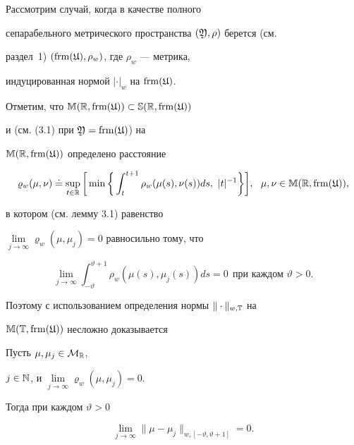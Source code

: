\begin{exams}


Рассмотрим случай, когда в качестве полного


сепарабельного метрического пространства $(\frak Y,\rho)$ берется (см.


раздел~1) $(\operatorname{frm}(\frak U),\rho_w)$, где $\rho_w$ --- метрика,


индуцированная нормой $|\cdot|_w$ на $\operatorname{frm}(\frak U)$.


Отметим, что $\Bbb M(\Bbb R,\operatorname{frm}(\frak U))\subset\Bbb S(\Bbb R,\operatorname{frm}(\frak U))$


и (см. (3.1) при $\frak Y=\operatorname{frm}(\frak U)$) на


$\Bbb M(\Bbb R,\operatorname{frm}(\frak U))$ определено расстояние


$$


\varrho_w(\mu,\nu)\doteq\sup_{t\in\Bbb R}


\bigg[\min\bigg\{\int_t^{t+1}


\rho_w(\mu(s),\nu(s))ds,\ |t|^{-1}\bigg\}\bigg],


\ \ \mu, \nu\in\Bbb M(\Bbb R,\frm(\frak U)),


$$


в котором (см. лемму 3.1) равенство


$\lim\limits_{j\to\infty}\varrho_w(\mu,\mu_j)=0$ равносильно тому, что


$$


\lim_{j\to\infty}


\int_{-\vartheta}^{\vartheta+1}\rho_w(\mu(s),\mu_j(s))ds=0


\ \ \text{при каждом $\vartheta>0$}.


$$


Поэтому с использованием определения нормы $\|\cdot\|_{w,\Bbb T}$ на


$\Bbb M(\Bbb T,\operatorname{frm}(\frak U))$ несложно доказывается


\end{exams}








\begin{lems}


Пусть $\mu,\mu_j\in\cal M_{\Bbb R}$,


$j\in\Bbb N$, и $\lim\limits_{j\to\infty}\varrho_w(\mu,\mu_j)=0$.


Тогда при каждом $\vartheta>0$


$$


\lim\limits_{j\to\infty}


\|\mu-\mu_{j}\|_{w,[-\vartheta,\vartheta+1]}=0.


$$


\end{lems}





